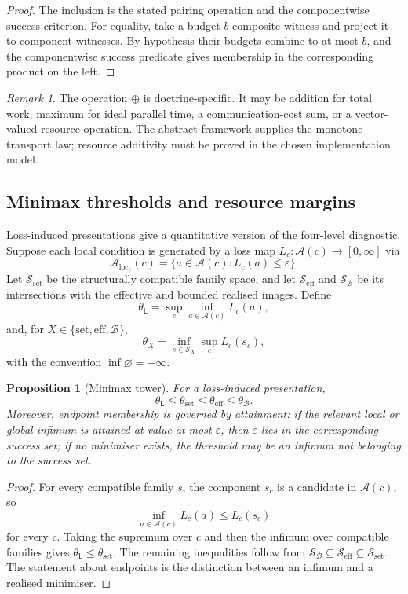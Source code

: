\documentclass[11pt]{article}
\theoremstyle{plain}
\newtheorem{proposition}[theorem]{Proposition}
\theoremstyle{definition}
\theoremstyle{remark}
\newtheorem{remark}[theorem]{Remark}
\newcommand{\LocalAdm}{\mathcal{A}_{\mathrm{loc}}}
\newcommand{\eps}{\varepsilon}
\begin{document}
\begin{proof}
The inclusion is the stated pairing operation and the componentwise success
criterion. For equality, take a budget-$b$ composite witness and project it to
component witnesses. By hypothesis their budgets combine to at most $b$, and the
componentwise success predicate gives membership in the corresponding product on
the left.
\end{proof}

\begin{remark}
The operation $\oplus$ is doctrine-specific. It may be addition for total work,
maximum for ideal parallel time, a communication-cost sum, or a vector-valued
resource operation. The abstract framework supplies the monotone transport law;
resource additivity must be proved in the chosen implementation model.
\end{remark}

\subsection{Minimax thresholds and resource margins}
\label{subsec:minimax-resource-calculus}

Loss-induced presentations give a quantitative version of the four-level
diagnostic. Suppose each local condition is generated by a loss map
$L_c:\mathcal A(c)\to[0,\infty]$ via
\[
\LocalAdm_\eps(c)=\{a\in\mathcal A(c):L_c(a)\le\eps\}.
\]
Let $\mathcal S_{\mathrm{set}}$ be the structurally compatible family space, and
let $\mathcal S_{\mathrm{eff}}$ and $\mathcal S_{\mathcal B}$ be its intersections
with the effective and bounded realised images. Define
\[
\theta_{\mathsf L}=\sup_c\inf_{a\in\mathcal A(c)}L_c(a),
\]
and, for $X\in\{\mathrm{set},\mathrm{eff},\mathcal B\}$,
\[
\theta_X=\inf_{s\in\mathcal S_X}\sup_c L_c(s_c),
\]
with the convention $\inf\varnothing=+\infty$.

\begin{proposition}[Minimax tower]
\label{prop:minimax-tower-monograph}
For a loss-induced presentation,
\[
\theta_{\mathsf L}\le
\theta_{\mathrm{set}}\le
\theta_{\mathrm{eff}}\le
\theta_{\mathcal B}.
\]
Moreover, endpoint membership is governed by attainment: if the relevant local
or global infimum is attained at value at most $\eps$, then $\eps$ lies in the
corresponding success set; if no minimiser exists, the threshold may be an
infimum not belonging to the success set.
\end{proposition}

\begin{proof}
For every compatible family $s$, the component $s_c$ is a candidate in
$\mathcal A(c)$, so
\[
\inf_{a\in\mathcal A(c)}L_c(a)\le L_c(s_c)
\]
for every $c$. Taking the supremum over $c$ and then the infimum over compatible
families gives $\theta_{\mathsf L}\le\theta_{\mathrm{set}}$. The remaining
inequalities follow from
$\mathcal S_{\mathcal B}\subseteq\mathcal S_{\mathrm{eff}}\subseteq
\mathcal S_{\mathrm{set}}$. The statement about endpoints is the distinction
between an infimum and a realised minimiser.
\end{proof}
\end{document}
